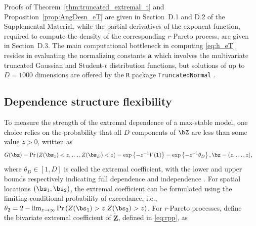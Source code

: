 \documentclass[12pt]{article}
\begin{document}
Proofs of Theorem~\ref{thm:truncated_extremal_t}  and Proposition~\ref{prop:AngDesn_eT} are given in Section~D.1 and D.2 of the Supplemental Material, while the partial derivatives of the exponent function, required to compute the density of the corresponding $r$-Pareto process, are given in Section~D.3.
The main computational bottleneck in computing \eqref{eq:h_eT} resides in evaluating the normalizing constants $\bm a$ which involves the multivariate truncated Gaussian and Student-$t$ distribution functions, but solutions of up to $D=1000$ dimensions are offered by the \texttt{R} package \texttt{TruncatedNormal} \citep{Botev.Belzile:2021}.   

\subsection{Dependence structure flexibility}
\label{ssec:flex_dep}
To measure the strength of the extremal dependence of a max-stable model, one choice relies on the probability that all $D$ components of $\bZ$ are less than some value $z>0$, 
written as
%
\begin{align*}
G(\bz) 
= \Pr \left( Z(\bs_1) < z, \ldots, Z(\bs_D)< z \right)
= \exp \left\{ - z^{-1} V(\bm 1)\right\}
= \exp \left\{ - z^{-1} \theta_{D}\right\}, \bz = (z, \ldots, z),
\end{align*}
%
where $\theta_{D} \in [1,D]$ is called the extremal coefficient,
with the lower and upper bounds respectively indicating full dependence and independence \citep[see][]{Smith:1990b, Davison.etal:2012}.
For spatial locations $(\bs_1, \bs_2)$, the extremal coefficient can be formulated using the limiting conditional probability of exceedance, i.e., $\theta_{2}= 2-\lim_{z\to\infty}\Pr\left(Z(\bs_1)>z|Z(\bs_2)>z\right)$. 
%
For $r$-Pareto processes, \citet{deFondeville.Davison:2018} define the bivariate extremal coefficient of $\bm{\tilde Z}$, defined in \eqref{eq:rpp}, as 
\end{document}
